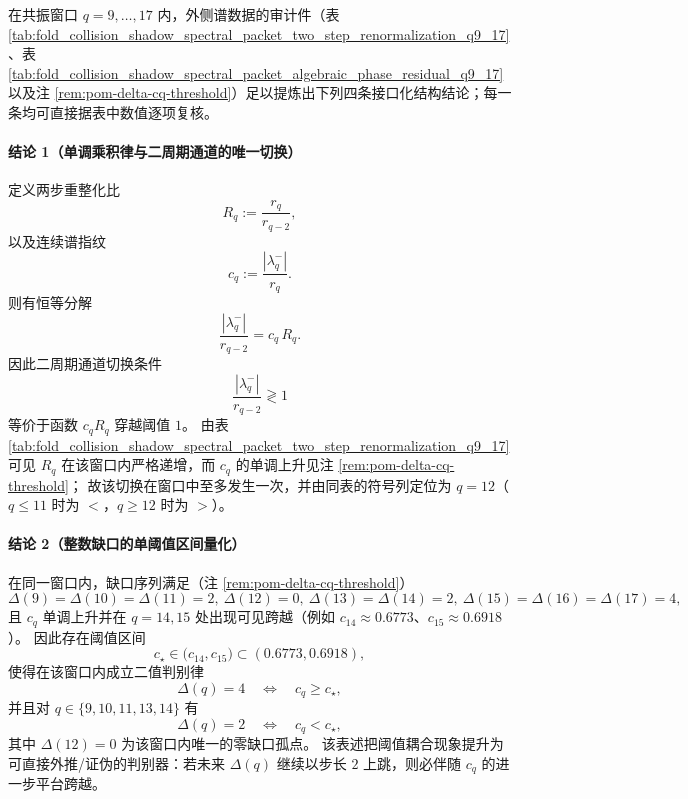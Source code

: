 \begin{remark}\label{rem:pom-resonance-window-final-structural-conclusions}
在共振窗口 \(q=9,\dots,17\) 内，外侧谱数据的审计件（表 \ref{tab:fold_collision_shadow_spectral_packet_two_step_renormalization_q9_17}、表 \ref{tab:fold_collision_shadow_spectral_packet_algebraic_phase_residual_q9_17} 以及注 \ref{rem:pom-delta-cq-threshold}）足以提炼出下列四条接口化结构结论；每一条均可直接据表中数值逐项复核。
\par

\paragraph{结论 1（单调乘积律与二周期通道的唯一切换）}
定义两步重整化比
\[
R_q:=\frac{r_q}{r_{q-2}},
\]
以及连续谱指纹
\[
c_q:=\frac{|\lambda_q^-|}{r_q}.
\]
则有恒等分解
\[
\frac{|\lambda_q^-|}{r_{q-2}}=c_q\,R_q.
\]
因此二周期通道切换条件
\[
\frac{|\lambda_q^-|}{r_{q-2}}\gtrless 1
\]
等价于函数 \(c_qR_q\) 穿越阈值 \(1\)。
由表 \ref{tab:fold_collision_shadow_spectral_packet_two_step_renormalization_q9_17} 可见 \(R_q\) 在该窗口内严格递增，而 \(c_q\) 的单调上升见注 \ref{rem:pom-delta-cq-threshold}；
故该切换在窗口中至多发生一次，并由同表的符号列定位为 \(q=12\)（\(q\le 11\) 时为 \(<\)，\(q\ge 12\) 时为 \(>\)）。
\par

\paragraph{结论 2（整数缺口的单阈值区间量化）}
在同一窗口内，缺口序列满足（注 \ref{rem:pom-delta-cq-threshold}）
\[
\Delta(9)=\Delta(10)=\Delta(11)=2,\ \Delta(12)=0,\ \Delta(13)=\Delta(14)=2,\ \Delta(15)=\Delta(16)=\Delta(17)=4,
\]
且 \(c_q\) 单调上升并在 \(q=14,15\) 处出现可见跨越（例如 \(c_{14}\approx 0.6773\)、\(c_{15}\approx 0.6918\)）。
因此存在阈值区间
\[
c_\star\in\bigl(c_{14},c_{15}\bigr)\subset(0.6773,0.6918),
\]
使得在该窗口内成立二值判别律
\[
\Delta(q)=4\quad\Longleftrightarrow\quad c_q\ge c_\star,
\]
并且对 \(q\in\{9,10,11,13,14\}\) 有
\[
\Delta(q)=2\quad\Longleftrightarrow\quad c_q<c_\star,
\]
其中 \(\Delta(12)=0\) 为该窗口内唯一的零缺口孤点。
该表述把阈值耦合现象提升为可直接外推/证伪的判别器：若未来 \(\Delta(q)\) 继续以步长 \(2\) 上跳，则必伴随 \(c_q\) 的进一步平台跨越。
\par


\end{remark}
